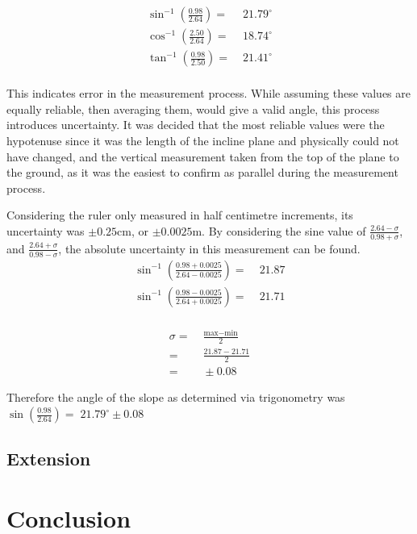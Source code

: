 \documentclass[11pt,a4paper]{article}
\begin{document}
 \begin{align*}
 	\sin^{-1}\left({\frac{0.98}{2.64}}\right)=&\;21.79^\circ\\
 	\cos^{-1}\left({\frac{2.50}{2.64}}\right)=&\;18.74^\circ\\
 	\tan^{-1}\left({\frac{0.98}{2.50}}\right)=&\;21.41^\circ\\
 \end{align*}
 
 This indicates error in the measurement process. While assuming these values are equally reliable, then averaging them, would give a valid angle, this process introduces uncertainty. It was decided that the most reliable values were the hypotenuse since it was the length of the incline plane and physically could not have changed, and the vertical measurement taken from the top of the plane to the ground, as it was the easiest to confirm as parallel during the measurement process.
 
 Considering the ruler only measured in half centimetre increments, its uncertainty was $\pm 0.25$cm, or $\pm0.0025$m. By considering the sine value of $\frac{2.64-\sigma}{0.98+\sigma}$, and $\frac{2.64+\sigma}{0.98-\sigma}$, the absolute uncertainty in this measurement can be found.
 \begin{align*}
 	 \sin^{-1}\left(\frac{0.98+0.0025}{2.64-0.0025}\right)=&\;21.87\\
 	 \sin^{-1}\left(\frac{0.98-0.0025}{2.64+0.0025}\right)=&\;21.71\\
 \end{align*}

 \begin{align*}
 	\sigma=&\;\frac{\textrm{max}-\textrm{min}}{2}
 	\\
 	=&\;\frac{21.87-21.71}{2}
 	\\
 	=&\;\pm0.08
 \end{align*}

 
 
 Therefore the angle of the slope as determined via trigonometry was $\sin\left({\frac{0.98}{2.64}}\right)=\;21.79^\circ \pm0.08$




\subsection{Extension}



\section{Conclusion}
\newpage



	
\end{document}
